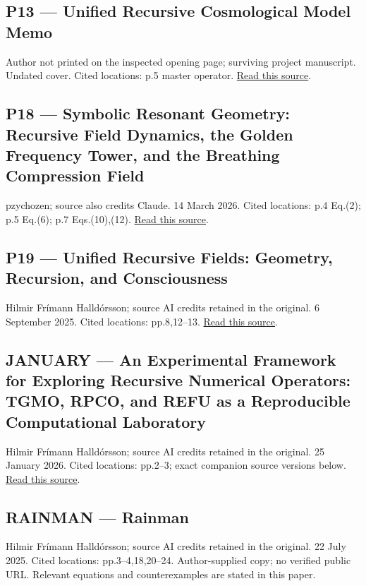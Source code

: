 \documentclass[11pt,a4paper]{article}
\begin{document}
\subsection*{P13 --- Unified Recursive Cosmological Model Memo}

Author not printed on the inspected opening page; surviving project manuscript. Undated cover. Cited locations: p.5 master operator. \href{https://zenodo.org/records/15770001/files/Unified\%20Recursive\%20Cosmological\%20Model.pdf}{Read this source}.


\subsection*{P18 --- Symbolic Resonant Geometry: Recursive Field Dynamics, the Golden Frequency Tower, and the Breathing Compression Field}

pzychozen; source also credits Claude. 14 March 2026. Cited locations: p.4 Eq.(2); p.5 Eq.(6); p.7 Eqs.(10),(12). \href{https://zenodo.org/records/19023429/files/SRG_paper.pdf}{Read this source}.


\subsection*{P19 --- Unified Recursive Fields: Geometry, Recursion, and Consciousness}

Hilmir Frímann Halldórsson; source AI credits retained in the original. 6 September 2025. Cited locations: pp.8,12--13. \href{https://zenodo.org/records/17068563/files/URF_core.pdf}{Read this source}.


\subsection*{JANUARY --- An Experimental Framework for Exploring Recursive Numerical Operators: TGMO, RPCO, and REFU as a Reproducible Computational Laboratory}

Hilmir Frímann Halldórsson; source AI credits retained in the original. 25 January 2026. Cited locations: pp.2--3; exact companion source versions below. \href{https://zenodo.org/records/18285147/files/refu__rpco__tgmo.pdf}{Read this source}.


\subsection*{RAINMAN --- Rainman}

Hilmir Frímann Halldórsson; source AI credits retained in the original. 22 July 2025. Cited locations: pp.3--4,18,20--24. Author-supplied copy; no verified public URL. Relevant equations and counterexamples are stated in this paper.
\end{document}
